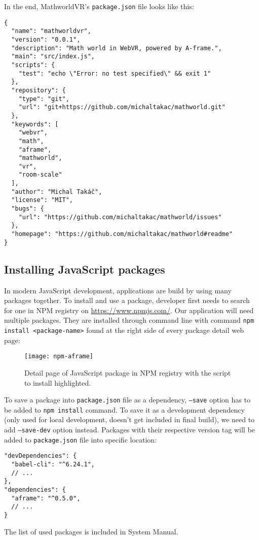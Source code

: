 In the end, MathworldVR's \texttt{package.json} file looks like this:

\begin{lstlisting}
{
  "name": "mathworldvr",
  "version": "0.0.1",
  "description": "Math world in WebVR, powered by A-frame.",
  "main": "src/index.js",
  "scripts": {
    "test": "echo \"Error: no test specified\" && exit 1"
  },
  "repository": {
    "type": "git",
    "url": "git+https://github.com/michaltakac/mathworld.git"
  },
  "keywords": [
    "webvr",
    "math",
    "aframe",
    "mathworld",
    "vr",
    "room-scale"
  ],
  "author": "Michal Takáč",
  "license": "MIT",
  "bugs": {
    "url": "https://github.com/michaltakac/mathworld/issues"
  },
  "homepage": "https://github.com/michaltakac/mathworld#readme"
}
\end{lstlisting}

\subsection{Installing JavaScript packages}
In modern JavaScript development, applications are build by using many packages together. To install and use a package, developer first needs to search for one in NPM registry on \url{https://www.npmjs.com/}. Our application will need multiple packages. They are installed through command line with command \texttt{npm install <package-name>} found at the right side of every package detail web page:

\begin{figure}[ht!]
\centering
\texttt{[image: npm-aframe]}
\caption{Detail page of JavaScript package in NPM registry with the script to install highlighted.}
\label{r:61}
\end{figure}

To save a package into \texttt{package.json} file as a dependency, \texttt{--save} option has to be added to \texttt{npm install} command. To save it as a development dependency (only used for local development, doesn't get included in final build), we need to add \texttt{--save-dev} option instead. Packages with their respective version tag will be added to \texttt{package.json} file into specific location:

\begin{lstlisting}
"devDependencies": {
  "babel-cli": "^6.24.1",
  // ...
},
"dependencies": {
  "aframe": "^0.5.0",
  // ...
}
\end{lstlisting}

The list of used packages is included in System Manual.

